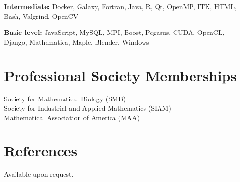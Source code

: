 \documentclass[11pt]{article}
\begin{document}
\textbf{Intermediate:} Docker, Galaxy, Fortran, Java, R, Qt, OpenMP, ITK, HTML, Bash, Valgrind, OpenCV

\textbf{Basic level:} JavaScript, MySQL, MPI, Boost, Pegasus, CUDA, OpenCL, Django, Mathematica, Maple, Blender, Windows

\section*{Professional Society Memberships}

Society for Mathematical Biology (SMB)\\
Society for Industrial and Applied Mathematics (SIAM)\\
Mathematical Association of America (MAA)

\section*{References}

Available upon request.
\end{document}
